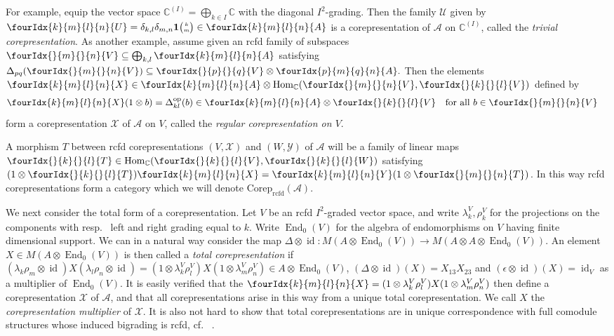 \documentclass[10pt]{article}
\DeclareMathOperator{\End}{\mathrm{End}}
\DeclareMathOperator{\id}{id}
\DeclareMathOperator{\Hom}{Hom}
\DeclareMathOperator{\op}{\mathrm{op}}
\DeclareMathOperator{\rcf}{\mathrm{rcfd}}
\newcommand{\Corep}{\mathrm{Corep}}
\newcommand{\C}{\mathbb{C}}
\newcommand{\Grt}[3]{#1{\tiny {\begin{pmatrix} #2\\#3\end{pmatrix}}}}
\newcommand{\UnitC}[2]{\Grt{\mathbf{1}}{#1}{#2}}
\newcommand{\Gr}[5]{\fourIdx{#2}{#4}{#3}{#5}{#1}}%
\newcommand{\Gru}[3]{\Gr{#1}{}{}{#2}{#3}}
\theoremstyle{definition}
\numberwithin{equation}{section}
\begin{document}
 For example, equip the vector space
  $\C^{(I)}=\bigoplus_{k\in I} \C$ with the diagonal
  $I^{2}$-grading. Then the family $\mathscr{U}$ given by $\Gr{U}{k}{l}{m}{n} = \delta_{k,l}\delta_{m,n} \UnitC{k}{m} \in
    \Gr{A}{k}{l}{m}{n}$
is a corepresentation of $\mathscr{A}$ on $\C^{(I)}$, called the
\emph{trivial corepresentation}. As another example,  assume  given an rcfd family of subspaces
  $\Gru{V}{m}{n} \subseteq \bigoplus_{k,l} \Gr{A}{k}{l}{m}{n}$ satisfying
  $\Delta_{pq}(\Gru{V}{m}{n}) \subseteq \Gru{V}{p}{q} \otimes
    \Gr{A}{p}{q}{m}{n}.$
Then the  elements $\Gr{X}{k}{l}{m}{n} \in \Gr{A}{k}{l}{m}{n} \otimes
  \Hom_{\C}(\Gru{V}{m}{n},\Gru{V}{k}{l})$ defined by 
  \begin{align*}
    \Gr{X}{k}{l}{m}{n}(1 \otimes b) &= \Delta^{\op}_{kl}(b) \in
    \Gr{A}{k}{l}{m}{n} \otimes \Gru{V}{k}{l} \quad
    \text{for all } b\in \Gru{V}{m}{n}
  \end{align*}
  form a corepresentation $\mathscr{X}$ of $\mathscr{A}$ on
  $V$, called the 
  \emph{regular corepresentation on $V$}. 

 A morphism  $T$ between rcfd corepresentations
  $(V,\mathscr{X})$ and $(W,\mathscr{Y})$ of $\mathscr{A}$ will be a family
  of linear maps $\Gru{T}{k}{l} \in
  \Hom_\C(\Gru{V}{k}{l},\Gru{W}{k}{l})$ satisfying $(1 \otimes
  \Gru{T}{k}{l})\Gr{X}{k}{l}{m}{n} = \Gr{Y}{k}{l}{m}{n}(1 \otimes
  \Gru{T}{m}{n})$.  In this way rcfd corepresentations form a category which we will denote
$\Corep_{\rcf}(\mathscr{A})$.

We next consider the total form of a corepresentation. Let $V$ be an rcfd $I^{2}$-graded vector space, and write $\lambda_k^V,\rho_k^V$ for the projections on the components with resp.~ left and right grading equal to $k$. Write $\End_0(V)$ for the algebra of endomorphisms on $V$ having finite dimensional support. We can in a natural way consider the map $\Delta \otimes \id \colon M(A \otimes \End_{0}(V)) \to M(A \otimes A \otimes \End_{0}(V))$. An element $X \in  M(A
  \otimes \End_{0}(V))$ is then called a \emph{total corepresentation} if $(\lambda_{k}\rho_{m} \otimes \id){X}(\lambda_{l}\rho_{n}
    \otimes \id) = (1 \otimes \lambda^{V}_{k}\rho^{V}_{l}){X}(1 \otimes
    \lambda^{V}_{m}\rho^{V}_{n}) \in A \otimes \End_0(V)$,  $(\Delta\otimes \id)(X)=X_{13}X_{23}$ and $(\epsilon \otimes \id)({X}) = \id_{V}$ as a multiplier of $\End_0(V)$. It is easily verified that the $\Gr{X}{k}{l}{m}{n} = (1 \otimes \lambda^{V}_{k}\rho^{V}_{l}){X}(1 \otimes
    \lambda^{V}_{m}\rho^{V}_{n})$ then define a corepresentation $\mathscr{X}$ of $\mathscr{A}$, and that all corepresentations arise in this way from a unique total corepresentation. We call $X$ the \emph{corepresentation multiplier} of $\mathscr{X}$. It is also not hard to show that total corepresentations are in unique correspondence with full comodule structures  whose induced bigrading is rcfd, cf.~ \cite[Definition 2.2, Definition 4.2 and Theorem 4.5]{Boh2}.
\end{document}
